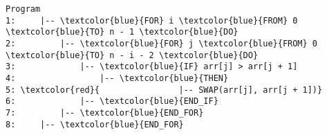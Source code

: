 \documentclass{article}
\begin{document}
    \begin{Verbatim}[commandchars=\\\{\}]
    Program
1:     |-- \textcolor{blue}{FOR} i \textcolor{blue}{FROM} 0 \textcolor{blue}{TO} n - 1 \textcolor{blue}{DO}
2:         |-- \textcolor{blue}{FOR} j \textcolor{blue}{FROM} 0 \textcolor{blue}{TO} n - i - 2 \textcolor{blue}{DO}
3:             |-- \textcolor{blue}{IF} arr[j] > arr[j + 1]
4:                 |-- \textcolor{blue}{THEN}
5: \textcolor{red}{                |-- SWAP(arr[j], arr[j + 1])}
6:             |-- \textcolor{blue}{END_IF}
7:         |-- \textcolor{blue}{END_FOR}
8:     |-- \textcolor{blue}{END_FOR}
    \end{Verbatim}
    
\end{document}
